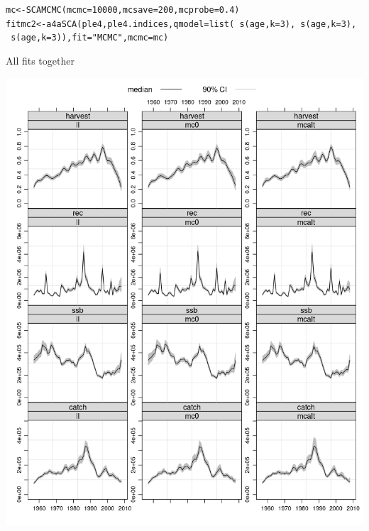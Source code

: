 \documentclass[a4paper,english,10pt]{article}\usepackage[]{graphicx}\usepackage[]{color}
\makeatletter
\newcommand{\hlnum}[1]{\textcolor[rgb]{0.063,0.58,0.627}{#1}}%
\newcommand{\hlstr}[1]{\textcolor[rgb]{0.063,0.58,0.627}{#1}}%
\newcommand{\hlopt}[1]{\textcolor[rgb]{0.196,0.196,0.196}{#1}}%
\newcommand{\hlstd}[1]{\textcolor[rgb]{0.196,0.196,0.196}{#1}}%
\newcommand{\hlkwb}[1]{\textcolor[rgb]{0.627,0,0.314}{#1}}%
\newcommand{\hlkwc}[1]{\textcolor[rgb]{0,0.631,0.314}{#1}}%
\newcommand{\hlkwd}[1]{\textcolor[rgb]{0.78,0.227,0.412}{#1}}%
\newenvironment{kframe}{%
 \def\at@end@of@kframe{}%
 \ifinner\ifhmode%
  \def\at@end@of@kframe{\end{minipage}}%
  \begin{minipage}{\columnwidth}%
 \fi\fi%
 \def\FrameCommand##1{\hskip\@totalleftmargin \hskip-\fboxsep
 \colorbox{shadecolor}{##1}\hskip-\fboxsep
     \hskip-\linewidth \hskip-\@totalleftmargin \hskip\columnwidth}%
 \MakeFramed {\advance\hsize-\width
   \@totalleftmargin\z@ \linewidth\hsize
   \@setminipage}}%
 {\par\unskip\endMakeFramed%
 \at@end@of@kframe}
\newenvironment{knitrout}{}{} %
\makeatother
\begin{document}
\begin{knitrout}
\color{fgcolor}\begin{kframe}
\begin{alltt}
\hlstd{mc} \hlkwb{<-} \hlkwd{SCAMCMC}\hlstd{(}\hlkwc{mcmc} \hlstd{=} \hlnum{10000}\hlstd{,} \hlkwc{mcsave} \hlstd{=} \hlnum{200}\hlstd{,} \hlkwc{mcprobe} \hlstd{=} \hlnum{0.4}\hlstd{)}
\hlstd{fitmc2} \hlkwb{<-} \hlkwd{a4aSCA}\hlstd{(ple4, ple4.indices,} \hlkwc{qmodel} \hlstd{=} \hlkwd{list}\hlstd{(}\hlopt{~}\hlkwd{s}\hlstd{(age,} \hlkwc{k} \hlstd{=} \hlnum{3}\hlstd{),} \hlopt{~}\hlkwd{s}\hlstd{(age,} \hlkwc{k} \hlstd{=} \hlnum{3}\hlstd{),}
    \hlopt{~}\hlkwd{s}\hlstd{(age,} \hlkwc{k} \hlstd{=} \hlnum{3}\hlstd{)),} \hlkwc{fit} \hlstd{=} \hlstr{"MCMC"}\hlstd{,} \hlkwc{mcmc} \hlstd{= mc)}
\end{alltt}
\end{kframe}
\end{knitrout}

All fits together

\begin{knitrout}
\color{fgcolor}

{\centering \includegraphics[width=.9\linewidth]{figure/unnamed-chunk-36-1} 

}



\end{knitrout}
\end{document}
